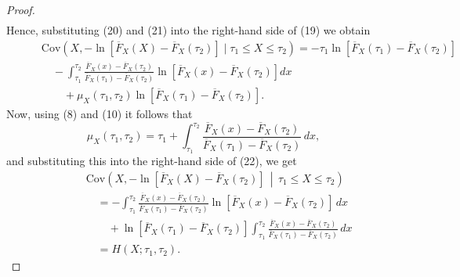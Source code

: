\documentclass[10pt,a4paper]{amsart}
\begin{document}
\begin{proof}
\begin{align}
	\end{align}
	Hence, substituting (20) and (21) into the right-hand side of (19) we obtain
	\begin{align}
		& \textstyle \qquad \mathrm{Cov}\left(X, -\ln[\overline{F}_X(X)-\overline{F}_X(\tau_2)] \mid \tau_1 \leq X \leq \tau_2 \right) = -\tau_1 \ln[\overline{F}_X(\tau_1)-\overline{F}_X(\tau_2)] \nonumber \\
		& \textstyle \qquad \quad - \int_{\tau_1}^{\tau_2} \frac{\overline{F}_X(x)-\overline{F}_X(\tau_2)}{\overline{F}_X(\tau_1)-\overline{F}_X(\tau_2)} \ln[\overline{F}_X(x)-\overline{F}_X(\tau_2)] dx \nonumber \\
		& \textstyle \qquad \qquad + \mu_X(\tau_1,\tau_2) \ln[\overline{F}_X(\tau_1)-\overline{F}_X(\tau_2)]. 
	\end{align}
	Now, using (8) and (10) it follows that
	$$ \textstyle \mu_X(\tau_1, \tau_2) = \tau_1 + \int_{\tau_1}^{\tau_2} \frac{\overline{F}_X(x) - \overline{F}_X(\tau_2)}{\overline{F}_X(\tau_1) - \overline{F}_X(\tau_2)} \, dx, $$
	and substituting this into the right-hand side of (22), we get
	\begin{align*}
		& \textstyle \qquad \mathrm{Cov}\left(X, -\ln\left[\overline{F}_X(X) - \overline{F}_X(\tau_2)\right] \,\middle|\, \tau_1 \leq X \leq \tau_2 \right) \\
		& \textstyle \qquad \quad = -\int_{\tau_1}^{\tau_2} \frac{\overline{F}_X(x) - \overline{F}_X(\tau_2)}{\overline{F}_X(\tau_1) - \overline{F}_X(\tau_2)} \ln\left[\overline{F}_X(x) - \overline{F}_X(\tau_2)\right] \, dx \\
		& \textstyle \qquad \qquad + \ln\left[\overline{F}_X(\tau_1) - \overline{F}_X(\tau_2)\right] \int_{\tau_1}^{\tau_2} \frac{\overline{F}_X(x) - \overline{F}_X(\tau_2)}{\overline{F}_X(\tau_1) - \overline{F}_X(\tau_2)} \, dx \\
		& \textstyle \qquad \quad = H(X; \tau_1, \tau_2).
	\end{align*}
\end{proof}
\end{document}
